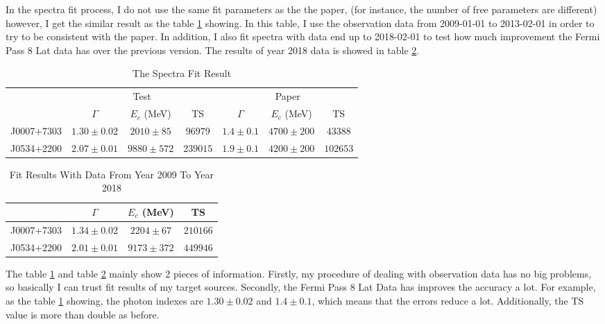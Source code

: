 \documentclass[12pt]{report}
\begin{document}
            In the spectra fit process, I do not use the same fit parameters as the the paper, (for instance, 
            the number of free parameters are different)
            however, I get the similar result as the table \ref{table: previous_result_comparison} showing. In this table, 
            I use the observation data from 2009-01-01 to 2013-02-01 in order to try to be consistent with 
            the paper. In addition, I also fit spectra with data end up to 2018-02-01 to test how much 
            improvement the Fermi Pass 8 Lat data has over the previous version. The results of year 2018 data 
            is showed in table \ref{table: 2018_fit_data}.

            \vspace{1cm}
            \begin{table}[!ht]
              \centering
              \begin{tabular}{|c|c|c|c|c|c|c|} 
                \hline 
                & \multicolumn{3}{|c|}{Test} & \multicolumn{3}{|c|}{Paper} \\ 
                \cline{2-7}
                & $\Gamma$ & $E_c$ (MeV) & TS & $\Gamma$ & $E_c$ (MeV) & TS \\ 
                \hline
                J0007+7303 & $1.30\pm0.02$ & $2010\pm85$ & $96979$ & $1.4\pm0.1$ & $4700\pm200$ & $43388$  \\
                \hline 
                J0534+2200 & $2.07\pm0.01$ & $9880\pm572$ & $239015$ & $1.9\pm0.1$ & $4200\pm200$ & $102653$  \\
                \hline
              \end{tabular}
              \caption{The Spectra Fit Result}
              \label{table: previous_result_comparison}
            \end{table}

            \begin{table}[!ht]
              \centering
              \begin{tabular}{|c|c|c|c|}
                \hline 
                &$\Gamma$& $E_c$ (MeV) & TS \\ \hline 
                J0007+7303 & $1.34\pm0.02$ & $2204\pm67$ & $210166$ \\ \hline 
                J0534+2200 & $2.01\pm0.01$ & $9173\pm372$ & $449946$ \\ \hline
              \end{tabular}
              \caption{Fit Results With Data From Year 2009 To Year 2018}
              \label{table: 2018_fit_data}
            \end{table}
            The table \ref{table: previous_result_comparison} and table \ref{table: 2018_fit_data} mainly 
            show 2 pieces of information. Firstly, my procedure of dealing with observation data has no
            big problems, so basically I can trust fit results of my target sources. Secondly, the Fermi 
            Pass 8 Lat Data has improves the accuracy a lot. For example, as the table 
            \ref{table: previous_result_comparison} showing, the photon indexes are 
            $1.30\pm0.02$ and $1.4\pm0.1$, which means that the errors reduce a lot. Additionally, the TS 
            value is more than double as before. 
\end{document}
